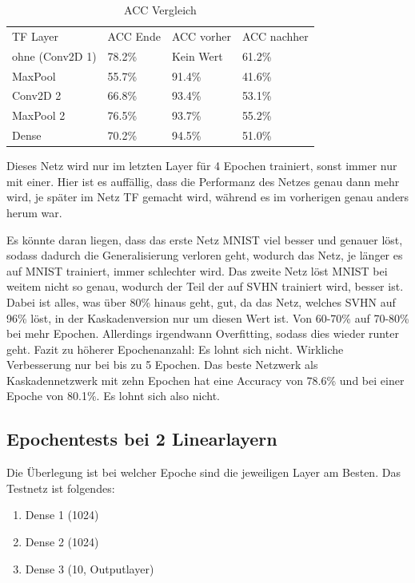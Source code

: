     \begin{table}[h!]
        \begin{center}
            \caption{ACC Vergleich}
            \label{tab2:Table}
            \begin{tabular}{l|l|l|l}
                TF Layer & ACC Ende & ACC vorher & ACC nachher \\
                ohne (Conv2D 1) & 78.2\% & Kein Wert & 61.2\% \\
                MaxPool & 55.7\% & 91.4\% & 41.6\% \\
                Conv2D 2 & 66.8\% & 93.4\% & 53.1\% \\
                MaxPool 2 & 76.5\% & 93.7\% & 55.2\% \\
                Dense & 70.2\% & 94.5\% & 51.0\% \\
            \end{tabular}
        \end{center}
    \end{table}
    Dieses Netz wird nur im letzten Layer für 4 Epochen trainiert, sonst immer nur mit einer. 
    Hier ist es auffällig, dass die Performanz des Netzes genau dann mehr wird, je später im Netz 
    TF gemacht wird, während es im vorherigen genau anders herum war. 

    Es könnte daran liegen, dass das erste Netz MNIST viel besser und genauer löst, sodass dadurch 
    die Generalisierung verloren geht, wodurch das Netz, je länger es auf MNIST trainiert, immer 
    schlechter wird. Das zweite Netz löst MNIST bei weitem nicht so genau, wodurch der Teil der auf 
    SVHN trainiert wird, besser ist. 
    Dabei ist alles, was über 80\% hinaus geht, gut, da das Netz, welches SVHN auf 96\% löst, in 
    der Kaskadenversion nur um diesen Wert ist. 
    Von 60-70\% auf 70-80\% bei mehr Epochen. Allerdings irgendwann Overfitting, sodass 
    dies wieder runter geht. Fazit zu höherer Epochenanzahl: Es lohnt sich nicht. 
    Wirkliche Verbesserung nur bei bis zu 5 Epochen.
    Das beste Netzwerk als Kaskadennetzwerk mit zehn Epochen hat eine Accuracy von 
    78.6\% und bei einer Epoche von 80.1\%. Es lohnt sich also nicht. 

\subsection{Epochentests bei 2 Linearlayern}
    Die Überlegung ist bei welcher Epoche sind die jeweiligen Layer am Besten. 
    Das Testnetz ist folgendes: 
    \begin{enumerate}
        \item Dense 1 (1024)
        \item Dense 2 (1024)
        \item Dense 3 (10, Outputlayer)
    \end{enumerate}

